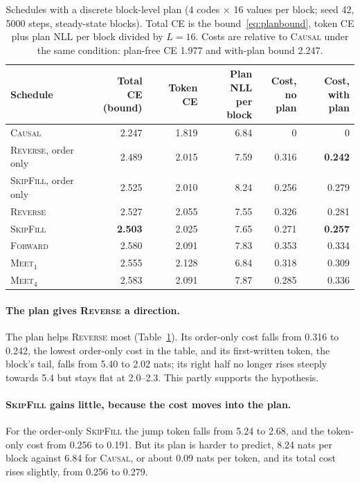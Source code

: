 \documentclass{article}
\theoremstyle{definition}
\theoremstyle{remark}
\newcommand{\name}[1]{\textup{\textsc{#1}}}
\newcommand{\sfill}{\name{SkipFill}\xspace}
\newcommand{\rev}{\name{Reverse}\xspace}
\newcommand{\fwd}{\name{Forward}\xspace}
\newcommand{\causal}{\name{Causal}\xspace}
\newcommand{\meet}[1]{\name{Meet}$_{#1}$}
\begin{document}
\begin{table}[t]
  \centering
  \caption{Schedules with a discrete block-level plan (4 codes $\times$ 16 values per block; seed 42, 5000 steps, steady-state blocks). Total CE is the bound~\eqref{eq:planbound}, token CE plus plan NLL per block divided by $L=16$. Costs are relative to \causal under the same condition: plan-free CE 1.977 and with-plan bound 2.247.}
  \label{tab:plan}
  \small
  \begin{tabular}{lrrrrr}
    \toprule
    Schedule & \makecell{Total CE\\(bound)} & Token CE & \makecell{Plan NLL\\per block} & \makecell{Cost,\\no plan} & \makecell{Cost,\\with plan} \\
    \midrule
    \causal                     & 2.247 & 1.819 & 6.84 & 0     & 0 \\
    \rev, order only            & 2.489 & 2.015 & 7.59 & 0.316 & \textbf{0.242} \\
    \sfill, order only          & 2.525 & 2.010 & 8.24 & 0.256 & 0.279 \\
    \midrule
    \rev                        & 2.527 & 2.055 & 7.55 & 0.326 & 0.281 \\
    \sfill                      & \textbf{2.503} & 2.025 & 7.65 & 0.271 & \textbf{0.257} \\
    \fwd                        & 2.580 & 2.091 & 7.83 & 0.353 & 0.334 \\
    \meet{1}                    & 2.555 & 2.128 & 6.84 & 0.318 & 0.309 \\
    \meet{4}                    & 2.583 & 2.091 & 7.87 & 0.285 & 0.336 \\
    \bottomrule
  \end{tabular}
\end{table}

\paragraph{The plan gives \rev a direction.}
The plan helps \rev most (Table~\ref{tab:plan}).
Its order-only cost falls from 0.316 to 0.242, the lowest order-only cost in the table, and its first-written token, the block's tail, falls from 5.40 to 2.02 nats; its right half no longer rises steeply towards 5.4 but stays flat at 2.0--2.3.
This partly supports the hypothesis.

\paragraph{\sfill gains little, because the cost moves into the plan.}
For the order-only \sfill the jump token falls from 5.24 to 2.68, and the token-only cost from 0.256 to 0.191.
But its plan is harder to predict, 8.24 nats per block against 6.84 for \causal, or about 0.09 nats per token, and its total cost rises slightly, from 0.256 to 0.279.
\end{document}
